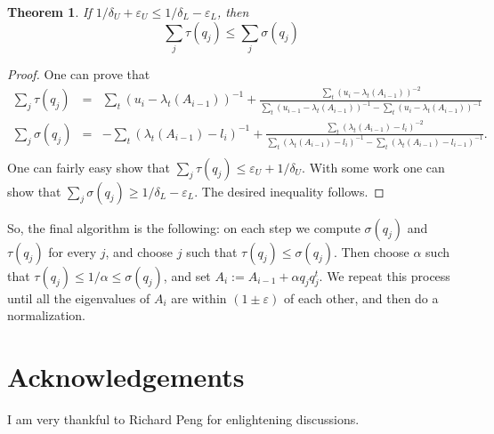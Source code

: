 \documentclass[12pt]{article}
\newcommand{\eps}{\varepsilon}
\newtheorem{theorem}{Theorem}
\begin{document}
    \begin{theorem}
        If $1 / \delta_U + \eps_U \leq 1 / \delta_L - \eps_L$, then
        $$
            \sum_j \tau(q_j) \leq \sum_j \sigma(q_j)
        $$
    \end{theorem}
    \begin{proof}
        One can prove that
        \begin{eqnarray*}
            \sum_j \tau(q_j) &=& \sum_{t}(u_i - \lambda_t(A_{i-1}))^{-1} + \frac{\sum_t(u_i - \lambda_t(A_{i-1}))^{-2}}
            {\sum_t (u_{i-1} - \lambda_t(A_{i-1}))^{-1} - \sum_t (u_i - \lambda_t(A_{i-1}))^{-1}}\\
            \sum_j \sigma(q_j) &=& -\sum_t(\lambda_t(A_{i-1}) - l_i)^{-1} + \frac{\sum_t(\lambda_t(A_{i-1}) - l_i)^{-2}}
            {\sum_t(\lambda_t(A_{i-1}) - l_i)^{-1} - \sum_t(\lambda_t(A_{i-1}) - l_{i-1})^{-1}}.\\
        \end{eqnarray*}
        One can fairly easy show that $\sum_j \tau(q_j) \leq \eps_U + 1 / \delta_U$. With some work
        one can show that $\sum_j \sigma(q_j) \geq 1 / \delta_L - \eps_L$. The desired inequality follows.
    \end{proof}

    So, the final algorithm is the following: on each step we compute $\sigma(q_j)$ and $\tau(q_j)$ for every
    $j$, and choose $j$ such that $\tau(q_j) \leq \sigma(q_j)$. Then choose $\alpha$ such that
    $\tau(q_j) \leq 1 / \alpha \leq \sigma(q_j)$, and set $A_i := A_{i-1} + \alpha q_j q_j^t$.
    We repeat this process until all the eigenvalues of $A_i$ are within $(1 \pm \eps)$ of each other, and then do a
    normalization.

    \section{Acknowledgements}

    I am very thankful to Richard Peng for enlightening discussions.
    
    
\end{document}
